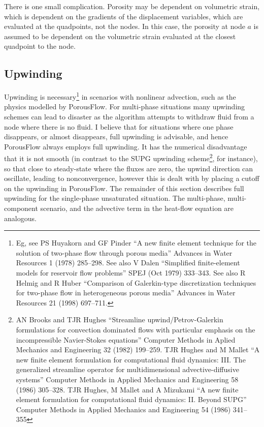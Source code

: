 \documentclass[12pt]{report}
\begin{document}
There is one small complication.  Porosity may be dependent on
volumetric strain, which is dependent on the gradients of the
displacement variables, which are evaluated at the quadpoints, not the
nodes.  In this case, the porosity at node $a$ is assumed to be
dependent on the volumetric strain evaluated at the closest quadpoint
to the node.

\subsection{Upwinding}
\label{upwinding.sec}

Upwinding is necessary\footnote{Eg, see PS Huyakorn and GF Pinder ``A
  new finite element technique for the solution of two-phase flow
  through porous media'' Advances in Water Resources 1 (1978)
  285--298.  See also V Dalen ``Simplified finite-element models for
  reservoir flow problems'' SPEJ (Oct 1979) 333--343.  See also R
  Helmig and R Huber ``Comparison of Galerkin-type discretization
  techniques for two-phase flow in heterogeneous porous media''
  Advances in Water Resources 21 (1998) 697--711.} in scenarios with
nonlinear advection, such as the physics modelled by PorousFlow.  For
multi-phase situations many upwinding schemes can lead to disaster as
the algorithm attempts to withdraw fluid from a node where there is no
fluid.  I believe that for situations where one phase disappears, or
almost disappears, full upwinding is advisable, and hence PorousFlow
always employs full upwinding.  It has the numerical disadvantage that
it is not smooth (in contrast to the SUPG upwinding scheme\footnote{AN
  Brooks and TJR Hughes ``Streamline upwind/Petrov-Galerkin
  formulations for convection dominated flows with particular emphasis
  on the incompressible Navier-Stokes equations'' Computer Methods in
  Aplied Mechanics and Engineering 32 (1982) 199--259.  TJR Hughes and
  M Mallet ``A new finite element formulation for computational fluid
  dynamics: III. The generalized streamline operator for
  multidimensional advective-diffusive systems'' Computer Methods in
  Applied Mechanics and Engineering 58 (1986) 305--328.  TJR Hughes, M
  Mallet and A Mizukami ``A new finite element formulation for
  computational fluid dynamics: II. Beyond SUPG'' Computer Methods in
  Applied Mechanics and Engineering 54 (1986) 341--355}, for
instance), so that close to steady-state where the fluxes are zero,
the upwind direction can oscillate, leading to nonconvergence, however
this is dealt with by placing a cutoff on the upwinding in PorousFlow.
The remainder of this section describes full upwinding for the
single-phase unsaturated situation.  The multi-phase, multi-component
scenario, and the advective term in the heat-flow equation are
analogous.
\end{document}
